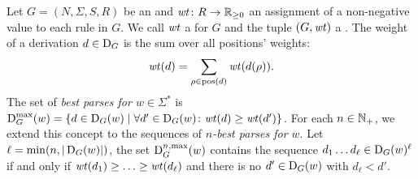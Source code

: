 \documentclass[../../document.tex]{subfiles}
\begin{document}
    \begin{definition}
        Let \(G = (N, \varSigma, S, R)\) be an  and \(\mathit{wt} \colon R \to \mathbb{R}_{\ge 0}\) an assignment of a non-negative value to each rule in \(G\).
        We call \(\mathit{wt}\) a  for \(G\) and the tuple \((G, \mathit{wt})\) a .
        The weight of a derivation \(d \in \operatorname{D}_G\) is the sum over all positions' weights: \[ \mathit{wt}(d) = \sum_{\rho \in \operatorname{pos}(d)} \mathit{wt}(d(\rho))\text{.} \]
        The set of \emph{best parses for \(w \in \varSigma^*\)} is \(\operatorname{D}^{\mathrm{max}}_G(w) = \{ d \in \operatorname{D}_G(w) \mid \forall d' \in \operatorname{D}_G(w)\colon \mathit{wt}(d) \geq \mathit{wt}(d') \}\).
        For each \(n\in \mathbb{N}_+\), we extend this concept to the sequences of \emph{\(n\)-best parses for \(w\)}.
        Let \(\ell = \min(n, |\operatorname{D}_G(w)|)\), the set \(\operatorname{D}^{n,\max}_G(w)\) contains the sequence \(d_1 \ldots d_\ell \in \operatorname{D}_G(w)^\ell\) if and only if \(\mathit{wt}(d_1) \geq \ldots \geq \mathit{wt}(d_\ell)\) and there is no \(d' \in \operatorname{D}_G(w)\) with \(d_\ell < d'\).
    \end{definition}
\end{document}

